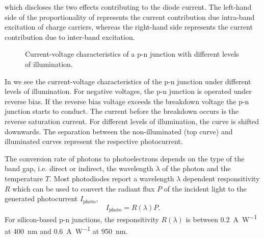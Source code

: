 which discloses the two effects contributing to the diode current.
The left-hand side of the proportionality of  represents the current contribution due intra-band excitation of charge carriers, whereas the right-hand side represents the current contribution due to inter-band excitation.
\begin{figure}[H]
	\centering
	\caption{Current-voltage characteristics of a p-n junction with different levels of illumination.}\label{fig:pn_junction_iv}
\end{figure}
In  we see the current-voltage characteristics of the p-n junction under different levels of illumination.
For negative voltages, the p-n junction is operated under reverse bias.
If the reverse bias voltage exceeds the breakdown voltage the p-n junction starts to conduct.
The current before the breakdown occurs is the reverse saturation current.
For different levels of illumination, the curve is shifted downwards.
The separation between the non-illuminated (top curve) and illuminated curves represent the respective photocurrent.

The conversion rate of photons to photoelectrons depends on the type of the band gap, i.e. direct or indirect, the wavelength $\lambda$ of the photon and the temperature $T$.
Most photodiodes report a wavelength $\lambda$ dependent responsitivity $R$ which can be used to convert the radiant flux $P$ of the incident light to the generated photocurrent $I_\text{photo}$,
\begin{equation}
	I_\text{photo}=R(\lambda)P
	\label{eq:responsitivity}.
\end{equation}
For silicon-based p-n junctions, the responsitivity $R(\lambda)$ is between \SI{0.2}{\ampere\per\watt} at \SI{400}{\nano\meter} and \SI{0.6}{\ampere\per\watt} at \SI{950}{\nano\meter}.

